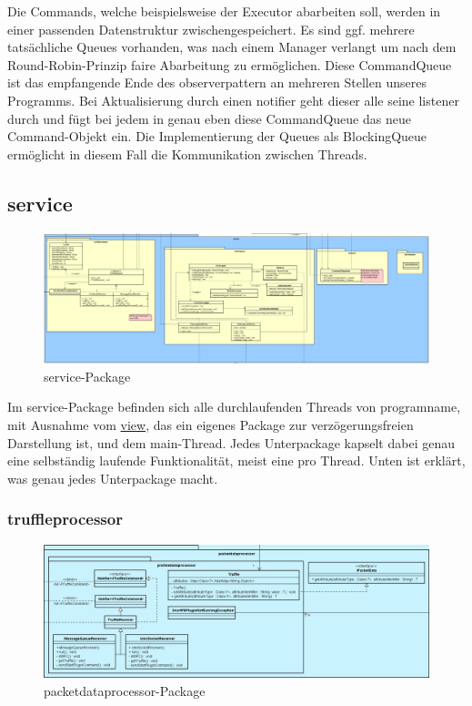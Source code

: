       \medskip
      Die Commands, welche beispielsweise der Executor abarbeiten soll, werden in
      einer passenden Datenstruktur zwischengespeichert. Es sind ggf. mehrere
      tatsächliche Queues vorhanden, was nach einem Manager verlangt um nach dem
      Round-Robin-Prinzip faire Abarbeitung zu ermöglichen. Diese CommandQueue
      ist das empfangende Ende des \gls{observerpattern} an mehreren Stellen unseres
      Programms. Bei Aktualisierung durch einen \gls{notifier} geht dieser alle
      seine \gls{listener} durch und fügt bei jedem in genau eben diese
      CommandQueue das neue Command-Objekt ein. Die Implementierung der Queues
      als BlockingQueue ermöglicht in diesem Fall die Kommunikation zwischen Threads.

\subsection{service}
\label{subsec:service}

\begin{figure}[H]
  \centering
  \includegraphics[width=\textwidth]{../diagramimages/service.png}
  \caption{service-Package}
\end{figure}

\medskip
Im service-Package befinden sich alle durchlaufenden Threads von \gls{programname},
mit Ausnahme vom \hyperref[subsec:view]{view}, das ein eigenes Package zur verzögerungsfreien Darstellung ist, und dem
main-Thread. Jedes Unterpackage kapselt dabei genau eine selbständig laufende Funktionalität, meist eine pro Thread. Unten ist erklärt, was genau jedes Unterpackage macht.

    \subsubsection{truffleprocessor}
    \label{subsubsec:truffleprocessor}

    \begin{figure}[H]
      \centering
      \includegraphics[width=\textwidth]{../diagramimages/packetdataprocessor.png}
      \caption{packetdataprocessor-Package}
    \end{figure}
    
